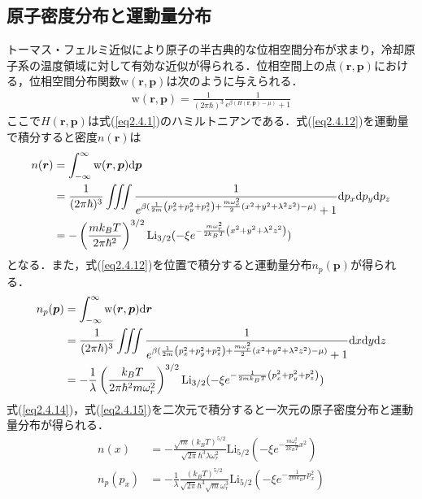 \documentclass[11pt,a4j,notitlepage]{jreport}
\begin{document}
\subsection{原子密度分布と運動量分布}
トーマス・フェルミ近似により原子の半古典的な位相空間分布が求まり，冷却原子系の温度領域に対して有効な近似が得られる\cite{demarco}．位相空間上の点$(\bm{r}, \bm{p})$における，位相空間分布関数$\mathrm{w}(\bm{r}, \bm{p})$は次のように与えられる．
\begin{align}
	\mathrm{w}(\bm{r}, \bm{p}) = \frac{1}{(2 \pi \hbar)^{3}} \frac{1}{e^{\beta(H(\bm{r}, \bm{p})-\mu)}+1}
	\label{eq2.4.13}
\end{align}
ここで$H(\bm{r}, \bm{p})$は式(\ref{eq2.4.1})のハミルトニアンである．式(\ref{eq2.4.12})を運動量で積分すると密度$n(\bm{r})$は
\begin{align}
 	n(\bm{r}) 
 	& = \int_{-\infty}^{\infty} \mathrm{w}(\bm{r}, \bm{p}) \mathrm{d} \bm{p}
 	\notag \\
 	& = \frac{1}{(2 \pi \hbar)^{3}} \iiint \frac{1}{e^{\beta( \frac{1}{2 m}\left(p_{x}^{2}+p_{y}^{2}+p_{z}^{2}\right)+\frac{m \omega_{r}^{2}}{2}\left(x^{2}+y^{2}+\lambda^{2} z^{2}\right)-\mu)}+1} \mathrm{d} p_x \mathrm{d} p_y \mathrm{d} p_z
 	\notag \\
 	& = - \left( \frac{mk_{B}T}{2 \pi \hbar^2} \right)^{3/2} \mathrm{Li}_{3/2}(- \xi e^{ - \frac{m \omega_{r}^{2}}{2k_{B} T}\left(x^{2}+y^{2}+\lambda^{2} z^{2}\right) } )
	\label{eq2.4.14}
\end{align}
となる．また，式(\ref{eq2.4.12})を位置で積分すると運動量分布$n_p(\bm{p})$が得られる．
\begin{align}
 	n_p(\bm{p}) 
 	& = \int_{-\infty}^{\infty} \mathrm{w}(\bm{r}, \bm{p}) \mathrm{d} \bm{r}
 	\notag \\
 	& = \frac{1}{(2 \pi \hbar)^{3}} \iiint \frac{1}{e^{\beta( \frac{1}{2 m}\left(p_{x}^{2}+p_{y}^{2}+p_{z}^{2}\right)+\frac{m \omega_{r}^{2}}{2}\left(x^{2}+y^{2}+\lambda^{2} z^{2}\right)-\mu)}+1} \mathrm{d} x \mathrm{d} y \mathrm{d} z
 	\notag \\
 	& = - \frac{1}{\lambda} \left( \frac{k_{B}T}{2 \pi \hbar^2 m \omega_{r}^2} \right)^{3/2} \mathrm{Li}_{3/2}(- \xi e^{ - \frac{1}{2mk_{B} T}\left(p_x^{2}+p_y^{2}+p_z^{2}\right) } )
	\label{eq2.4.15}
\end{align}
式(\ref{eq2.4.14})，式(\ref{eq2.4.15})を二次元で積分すると一次元の原子密度分布と運動量分布が得られる．
\begin{align}
 	n(x) & = - \frac{\sqrt{m}(k_{B}T)^{5/2}}{\sqrt{2 \pi} \hbar^3 \lambda \omega_r^2} \mathrm{Li}_{5/2}(- \xi e^{ - \frac{m \omega_{r}^{2}}{2k_{B} T} x^{2} } ) 
 	\label{eq2.4.16} \\
	n_p(p_x) & = - \frac{1}{\lambda} \frac{(k_{B}T)^{5/2}}{\sqrt{2 \pi} \hbar^3 \sqrt{m} \omega_r^3} \mathrm{Li}_{5/2}(- \xi e^{ - \frac{1}{2mk_{B} T} p_x^{2} } )
	\label{eq2.4.17}
\end{align}
\end{document}
